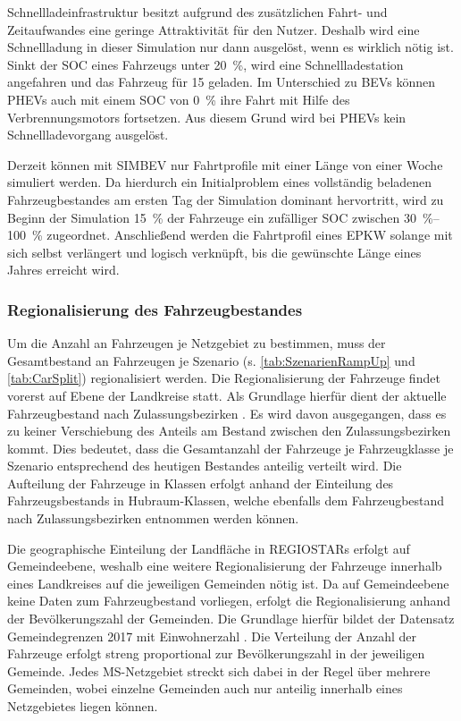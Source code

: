 

Schnellladeinfrastruktur besitzt aufgrund des zusätzlichen Fahrt- und Zeitaufwandes eine geringe Attraktivität für den Nutzer.
Deshalb wird eine Schnellladung in dieser Simulation nur dann ausgelöst, wenn es wirklich nötig ist.
Sinkt der \gls{SOC} eines Fahrzeugs unter \SI{20}{\percent}, wird eine Schnellladestation angefahren und das Fahrzeug für \SI{15}{\Minuten} geladen.
Im Unterschied zu \glspl{BEV} können \glspl{PHEV} auch mit einem \gls{SOC} von \SI{0}{\percent} ihre Fahrt mit Hilfe des Verbrennungsmotors fortsetzen.
Aus diesem Grund wird bei \glspl{PHEV} kein Schnellladevorgang ausgelöst.\medskip

Derzeit können mit \gls{SIMBEV} nur Fahrtprofile mit einer Länge von einer Woche simuliert werden.
Da hierdurch ein Initialproblem eines vollständig beladenen Fahrzeugbestandes am ersten Tag der Simulation dominant hervortritt, wird zu Beginn der Simulation \SI{15}{\percent} der Fahrzeuge ein zufälliger \gls{SOC} zwischen \SIrange[range-phrase=~bis~]{30}{100}{\percent} zugeordnet.
Anschließend werden die Fahrtprofil eines \gls{EPKW} solange mit sich selbst verlängert und logisch verknüpft, bis die gewünschte Länge eines Jahres erreicht wird.


\subsubsection{Regionalisierung des Fahrzeugbestandes}

Um die Anzahl an Fahrzeugen je Netzgebiet zu bestimmen, muss der Gesamtbestand an Fahrzeugen je Szenario (s. \autoref{tab:SzenarienRampUp} und \autoref{tab:CarSplit}) regionalisiert werden.
Die Regionalisierung der Fahrzeuge findet vorerst auf Ebene der Landkreise statt.
Als Grundlage hierfür dient der aktuelle Fahrzeugbestand nach Zulassungsbezirken \cite[][Stand: ]{KBAPLZ2020}.
Es wird davon ausgegangen, dass es zu keiner Verschiebung des Anteils am Bestand zwischen den Zulassungsbezirken kommt.
Dies bedeutet, dass die Gesamtanzahl der Fahrzeuge je Fahrzeugklasse je Szenario entsprechend des heutigen Bestandes anteilig verteilt wird.
Die Aufteilung der Fahrzeuge in Klassen erfolgt anhand der Einteilung des Fahrzeugsbestands in Hubraum-Klassen, welche ebenfalls dem Fahrzeugbestand nach Zulassungsbezirken entnommen werden können.\medskip

Die geographische Einteilung der Landfläche in \glspl{REGIOSTAR} erfolgt auf Gemeindeebene, weshalb eine weitere Regionalisierung der Fahrzeuge innerhalb eines Landkreises auf die jeweiligen Gemeinden nötig ist.
Da auf Gemeindeebene keine Daten zum Fahrzeugbestand vorliegen, erfolgt die Regionalisierung anhand der Bevölkerungszahl der Gemeinden.
Die Grundlage hierfür bildet der Datensatz \glqq Gemeindegrenzen 2017 mit Einwohnerzahl\grqq{} \cite[][Stand: ]{EDG2020}.
Die Verteilung der Anzahl der Fahrzeuge erfolgt streng proportional zur Bevölkerungszahl in der jeweiligen Gemeinde.
Jedes \gls{MS}-Netzgebiet streckt sich dabei in der Regel über mehrere Gemeinden, wobei einzelne Gemeinden auch nur anteilig innerhalb eines Netzgebietes liegen können.\medskip


